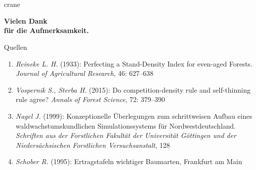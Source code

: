 \section*{}

\begin{frame}[plain]
  \begin{center}

    \begin{minipage}{0.75\textwidth}
      \begin{beamercolorbox}{crane}
        \begin{center}
          \vspace{1em}
          \textbf{\huge Vielen Dank}
          \\
          \textbf{\small für die Aufmerksamkeit.}
          \\
          \vspace{1em}
        \end{center}
      \end{beamercolorbox}
    \end{minipage}

    \begin{minipage}{0.73\textwidth}  %
      \begin{block}{Quellen}
        \begin{tiny}
          \begin{enumerate}
          \item \emph{Reineke L. H.} (1933): Perfecting a Stand-Density Index for even-aged Forests. \emph{Journal of Agricultural Research}, 46: 627--638
          \item \emph{Vospernik S., Sterba H.} (2015): Do competition-density rule and self-thinning rule agree? \emph{Annals of Forest Science}, 72: 379--390
          \item \emph{Nagel J.} (1999): Konzeptionelle Überlegungen zum schrittweisen Aufbau eines waldwachstumskundlichen Simulationssystems für Nordwestdeutschland. \emph{Schriften aus der Forstlichen Fakultät der Universität Göttingen und der Niedersächsischen Forstlichen Versuchsanstalt}, 128
          \item \emph{Schober R.} (1995): Ertragstafeln wichtiger Baumarten, Frankfurt am Main
          \end{enumerate}
        \end{tiny}
      \end{block}
    \end{minipage}
  \end{center}
\end{frame}

